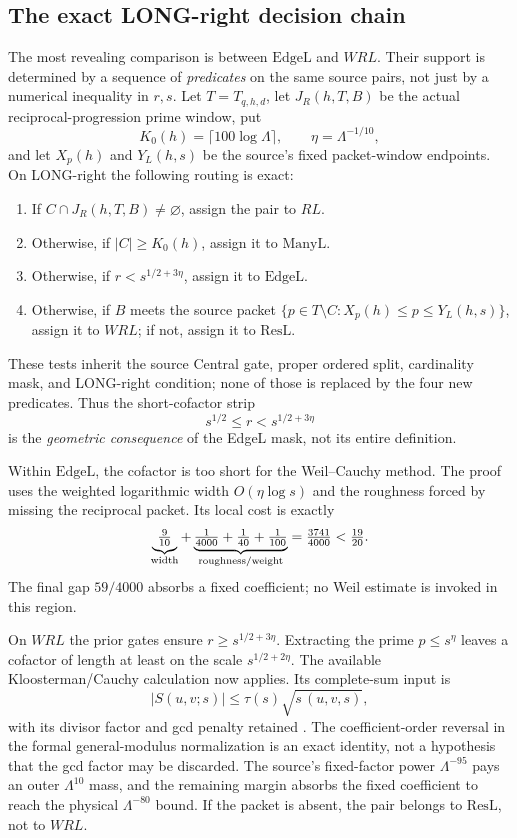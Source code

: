 \documentclass[11pt]{article}
\theoremstyle{definition}
\theoremstyle{remark}
\newcommand{\1}{\mathbf 1}
\begin{document}
\subsection{The exact LONG-right decision chain}

The most revealing comparison is between $\mathrm{EdgeL}$ and $WRL$.
Their support is determined by a sequence of \emph{predicates} on
the same source pairs, not just by a numerical inequality in $r,s$.
Let $T=T_{q,h,d}$, let $J_R(h,T,B)$ be the actual reciprocal-progression
prime window, put
\[
 K_0(h)=\lceil100\log\Lambda\rceil,\qquad
 \eta=\Lambda^{-1/10},
\]
and let $X_p(h)$ and $Y_L(h,s)$ be the source's fixed
packet-window endpoints. On LONG-right the following routing is exact:
\begin{enumerate}[leftmargin=*,itemsep=0.12em]
\item If $C\cap J_R(h,T,B)\ne\varnothing$, assign the pair to $RL$.
\item Otherwise, if $|C|\ge K_0(h)$, assign it to $\mathrm{ManyL}$.
\item Otherwise, if $r<s^{1/2+3\eta}$, assign it to $\mathrm{EdgeL}$.
\item Otherwise, if $B$ meets the source packet
 $\{p\in T\setminus C:X_p(h)\le p\le Y_L(h,s)\}$,
 assign it to $WRL$; if not, assign it to $\mathrm{ResL}$.
\end{enumerate}
These tests inherit the source Central gate, proper ordered split,
cardinality mask, and LONG-right condition; none of those is replaced
by the four new predicates. Thus the short-cofactor strip
\begin{equation}\label{eq:edge-strip}
 s^{1/2}\le r<s^{1/2+3\eta}
\end{equation}
is the \emph{geometric consequence} of the EdgeL mask, not its
entire definition.

Within $\mathrm{EdgeL}$, the cofactor is too short for the
Weil--Cauchy method. The proof uses the weighted logarithmic
width $O(\eta\log s)$ and the roughness forced by missing the
reciprocal packet. Its local cost is exactly
\[
 \underbrace{\tfrac9{10}}_{\rm width}
 +\underbrace{\tfrac1{4000}+\tfrac1{40}+\tfrac1{100}}_{\rm roughness/weight}
 =\tfrac{3741}{4000}<\tfrac{19}{20}.
\]
The final gap $59/4000$ absorbs a fixed coefficient; no Weil estimate
is invoked in this region.

On $WRL$ the prior gates ensure $r\ge s^{1/2+3\eta}$.
Extracting the prime $p\le s^\eta$ leaves a cofactor of length
at least on the scale $s^{1/2+2\eta}$. The available
Kloosterman/Cauchy calculation now applies. Its complete-sum input is
\begin{equation}\label{eq:kloosterman-bound}
 |S(u,v;s)|\le\tau(s)\sqrt{s\,(u,v,s)},
\end{equation}
with its divisor factor and gcd penalty retained
\cite{Weil1948,Estermann1961,IwaniecKowalski2004}.
The coefficient-order reversal in the formal general-modulus
normalization is an exact identity, not a hypothesis that the gcd
factor may be discarded. The source's fixed-factor power
$\Lambda^{-95}$ pays an outer $\Lambda^{10}$ mass, and the
remaining margin absorbs the fixed coefficient to reach the physical
$\Lambda^{-80}$ bound. If the packet is absent, the pair belongs to
$\mathrm{ResL}$, not to $WRL$.
\end{document}
